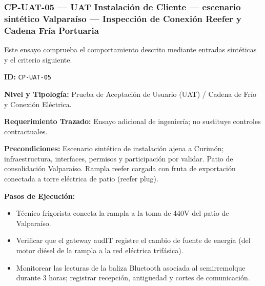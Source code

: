 \subsubsection*{CP-UAT-05 — UAT Instalación de Cliente — escenario sintético Valparaíso — Inspección de Conexión Reefer y Cadena Fría Portuaria}\label{sec:9-cp-uat-05}

Este ensayo comprueba el comportamiento descrito mediante entradas sintéticas y el criterio siguiente.

\par\noindent\textbf{ID:} \texttt{CP-\allowbreak{}UAT-\allowbreak{}05}\par
\par\noindent\textbf{Nivel y Tipología:} Prueba de Aceptación de Usuario (UAT) / Cadena de Frío y Conexión Eléctrica.\par
\par\noindent\textbf{Requerimiento Trazado:} Ensayo adicional de ingeniería; no sustituye controles contractuales.\par
\par\noindent\textbf{Precondiciones:} Escenario sintético de instalación ajena a Curimón; infraestructura, interfaces, permisos y participación por validar.  Patio de consolidación Valparaíso. Rampla reefer cargada con fruta de exportación conectada a torre eléctrica de patio (reefer plug).\par
\par\noindent\textbf{Pasos de Ejecución:}\par
\begin{itemize}
\item Técnico frigorista conecta la rampla a la toma de 440V del patio de Valparaíso.
\item Verificar que el gateway audIT registre el cambio de fuente de energía (del motor diésel de la rampla a la red eléctrica trifásica).
\item Monitorear las lecturas de la baliza Bluetooth asociada al semirremolque durante 3 horas; registrar recepción, antigüedad y cortes de comunicación.
\end{itemize}

